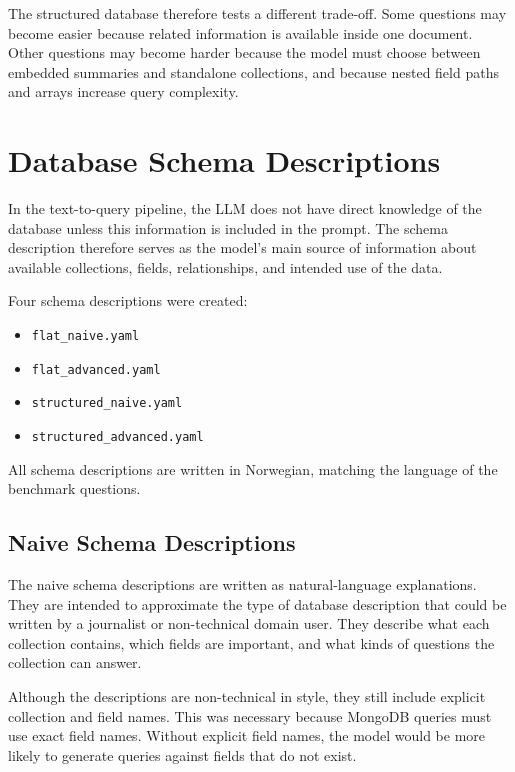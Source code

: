 The structured database therefore tests a different trade-off. Some questions may become easier because related information is available inside one document. Other questions may become harder because the model must choose between embedded summaries and standalone collections, and because nested field paths and arrays increase query complexity.

\section{Database Schema Descriptions}

In the text-to-query pipeline, the LLM does not have direct knowledge of the database unless this information is included in the prompt. The schema description therefore serves as the model's main source of information about available collections, fields, relationships, and intended use of the data.

Four schema descriptions were created:

\begin{itemize}
    \item \texttt{flat\_naive.yaml}
    \item \texttt{flat\_advanced.yaml}
    \item \texttt{structured\_naive.yaml}
    \item \texttt{structured\_advanced.yaml}
\end{itemize}

All schema descriptions are written in Norwegian, matching the language of the benchmark questions.

\subsection{Naive Schema Descriptions}

The naive schema descriptions are written as natural-language explanations. They are intended to approximate the type of database description that could be written by a journalist or non-technical domain user. They describe what each collection contains, which fields are important, and what kinds of questions the collection can answer.

Although the descriptions are non-technical in style, they still include explicit collection and field names. This was necessary because MongoDB queries must use exact field names. Without explicit field names, the model would be more likely to generate queries against fields that do not exist.

